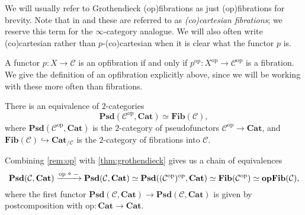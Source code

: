 \documentclass{MetricNotes2023}
\newcommand{\circo}{~\raisebox{1pt}{\tikz \draw[line width=0.6pt] circle(1.1pt);}~}
\begin{document}
We will usually refer to Grothendieck (op)fibrations as just (op)fibrations for brevity. Note that in \autocite{symmetricmonoidal} and \autocite{kerodon} these are referred to as \textit{(co)cartesian fibrations}; we reserve this term for the \(\infty\)-category analogue. We will also often write (co)cartesian rather than \(p\)-(co)cartesian when it is clear what the functor \(p\) is.

\begin{remark}\label{rem:op}
A functor \(p : X \to \mathcal{C}\) is an opfibration if and only if \(p^{\text{op}} : X^{\text{op}}\to \mathcal{C}^{\text{op}}\) is a fibration. We give the definition of an opfibration explicitly above, since we will be working with these more often than fibrations.  
\end{remark}


\begin{theorem}\label{thm:grothendieck}
There is an equivalence of \(2\)-categories 
\[\textbf{Psd}(\mathcal{C}^{\text{op}}, \textbf{Cat})\simeq \textbf{Fib}(\mathcal{C}),\]
where \(\textbf{Psd}(\mathcal{C}^{\text{op}}, \textbf{Cat})\) is the \(2\)-category of pseudofunctors \(\mathcal{C}^{\text{op}}\to \textbf{Cat}\), and \(\textbf{Fib}(\mathcal{C})\hookrightarrow \textbf{Cat}_{/\mathcal{C}}\) is the \(2\)-category of fibrations into \(\mathcal{C}\). 
\end{theorem}

\begin{remark}\label{rem:ophell}
Combining \ref{rem:op} with \ref{thm:grothendieck} gives us a chain of equivalences
\[\textbf{Psd}(\mathcal{C}, \textbf{Cat})\xrightarrow{\text{op} \circo -} \textbf{Psd}(\mathcal{C}, \textbf{Cat})\simeq \textbf{Psd}((\mathcal{C}^{\text{op}})^{\text{op}}, \textbf{Cat}) \simeq \textbf{Fib}(\mathcal{C}^{\text{op}}) \simeq \textbf{opFib}(\mathcal{C}),\]
where the first functor \(\textbf{Psd}(\mathcal{C}, \textbf{Cat}) \to \textbf{Psd}(\mathcal{C}, \textbf{Cat})\) is given by postcomposition with \(\text{op} : \textbf{Cat}\to \textbf{Cat}\).  
\end{remark}
\end{document}
